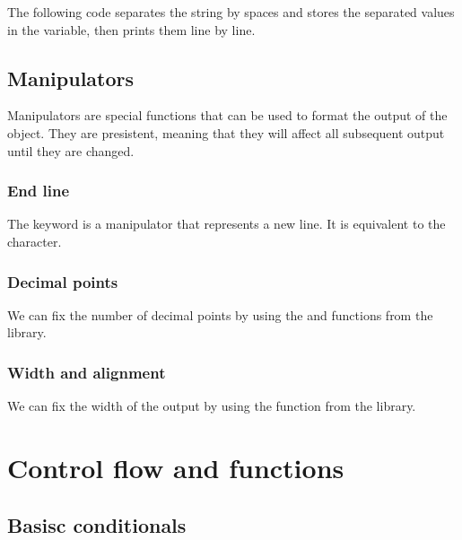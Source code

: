 \documentclass{article}
\begin{document}
The following code separates the string  by spaces and stores the separated values in the  variable, then prints them line by line.



\subsection{Manipulators}
Manipulators are special functions that can be used to format the output of the  object. They are presistent, meaning that they will affect all subsequent output until they are changed.

\subsubsection{End line}
The keyword  is a manipulator that represents a new line. It is equivalent to the  character.

\subsubsection{Decimal points}
We can fix the number of decimal points by using the  and  functions from the  library.


\subsubsection{Width and alignment}
We can fix the width of the output by using the  function from the  library.



\section{Control flow and functions}
\subsection{Basisc conditionals}

\end{document}
